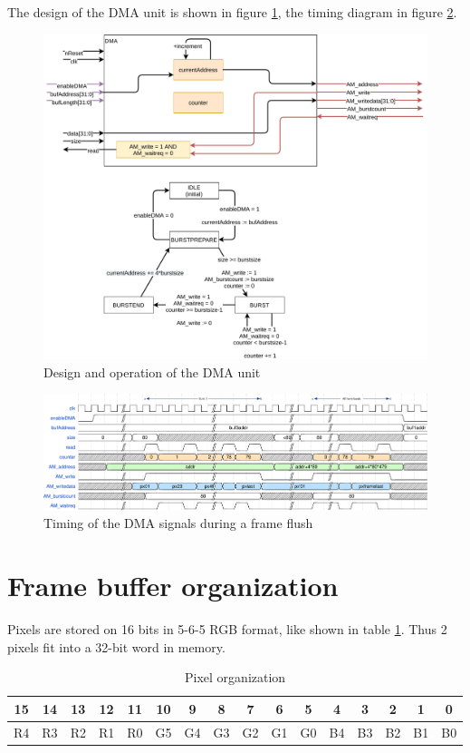 \documentclass[12pt,a4paper]{article}
\begin{document}
The design of the DMA unit is shown in figure \ref{fig:dma}, the timing diagram in figure \ref{fig:dmatime}.

\begin{figure}[h!]
	\centering
	\includegraphics[width=.85\textwidth]{figures/dma}
	\caption{Design and operation of the DMA unit}
	\label{fig:dma}
\end{figure}

\begin{figure}[ht!]
	\centering
	\includegraphics[width=\textwidth]{figures/dma_timings}
	\caption{Timing of the DMA signals during a frame flush}
	\label{fig:dmatime}
\end{figure}


\section{Frame buffer organization}

Pixels are stored on 16 bits in 5-6-5 RGB format, like shown in table \ref{tab:pixel}. Thus 2 pixels fit into a 32-bit word in memory.

\begin{table}[h]
	\centering
	\begin{tabular}{|c|c|c|c|c||c|c|c|c|c|c||c|c|c|c|c|}
		\hline
		15 & 14 & 13 & 12 & 11 & 10 & 9 & 8 & 7 & 6 & 5 & 4 & 3 & 2 & 1 & 0 \\
		\hline
		R4 & R3 & R2 & R1 & R0 & G5 & G4 & G3 & G2 & G1 & G0 & B4 & B3 & B2 & B1 & B0 \\
		\hline	
	\end{tabular}
	\caption{Pixel organization}
	\label{tab:pixel}
\end{table}
\end{document}
